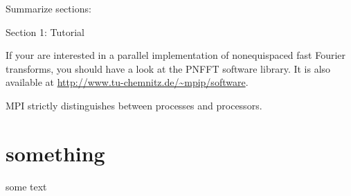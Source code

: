 Summarize sections:
\begin{compactitem}
  \item Section 1: Tutorial
\end{compactitem}


If your are interested in a parallel implementation of nonequispaced fast Fourier
transforms, you should have a look at the PNFFT software library. It is also available
at \url{http://www.tu-chemnitz.de/~mpip/software}.


MPI strictly distinguishes between processes and processors. 

\section{something}
some text

